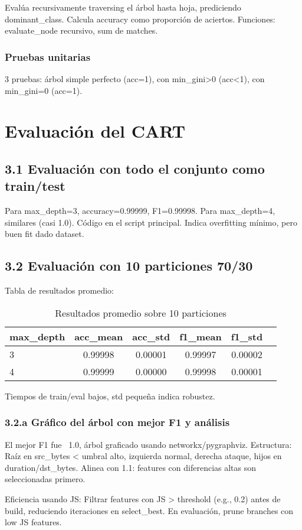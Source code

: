 \documentclass{article}
\begin{document}
Evalúa recursivamente traversing el árbol hasta hoja, prediciendo dominant\_class. Calcula accuracy como proporción de aciertos. Funciones: evaluate\_node recursivo, sum de matches.

\subsubsection{Pruebas unitarias}

3 pruebas: árbol simple perfecto (acc=1), con min\_gini>0 (acc<1), con min\_gini=0 (acc=1).



\section{Evaluación del CART}

\subsection{3.1 Evaluación con todo el conjunto como train/test}

Para max\_depth=3, accuracy=0.99999, F1=0.99998. Para max\_depth=4, similares (casi 1.0). Código en el script principal. Indica overfitting mínimo, pero buen fit dado dataset.

\subsection{3.2 Evaluación con 10 particiones 70/30}

Tabla de resultados promedio:

\begin{table}[H]
\centering
\caption{Resultados promedio sobre 10 particiones}
\begin{tabular}{lccccc}
\toprule
max\_depth & acc\_mean & acc\_std & f1\_mean & f1\_std \\
\midrule
3 & 0.99998 & 0.00001 & 0.99997 & 0.00002 \\
4 & 0.99999 & 0.00000 & 0.99998 & 0.00001 \\
\bottomrule
\end{tabular}
\label{tab:results}
\end{table}

Tiempos de train/eval bajos, std pequeña indica robustez.

\subsubsection{3.2.a Gráfico del árbol con mejor F1 y análisis}

El mejor F1 fue ~1.0, árbol graficado usando networkx/pygraphviz. Estructura: Raíz en src\_bytes < umbral alto, izquierda normal, derecha ataque, hijos en duration/dst\_bytes. Alinea con 1.1: features con diferencias altas son seleccionadas primero.

Eficiencia usando JS: Filtrar features con JS > threshold (e.g., 0.2) antes de build, reduciendo iteraciones en select\_best. En evaluación, prune branches con low JS features.
\end{document}
